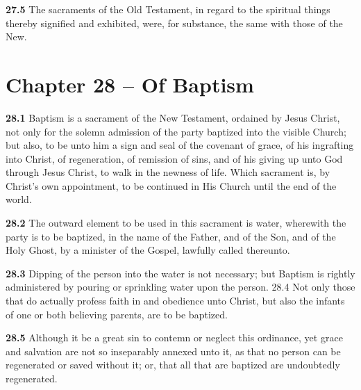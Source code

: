 \par\textbf{27.5} The sacraments of the Old Testament, in regard to the spiritual things thereby signified and exhibited, were, for substance, the same with those of the New.  

\section{Chapter 28 -- Of Baptism}

\par\textbf{28.1} Baptism is a sacrament of the New Testament, ordained by Jesus Christ, not only for the solemn admission of the party baptized into the visible Church; but also, to be unto him a sign and seal of the covenant of grace, of his ingrafting into Christ, of regeneration, of remission of sins, and of his giving up unto God through Jesus Christ, to walk in the newness of life. Which sacrament is, by Christ's own appointment, to be continued in His Church until the end of the world.   

\par\textbf{28.2} The outward element to be used in this sacrament is water, wherewith the party is to be baptized, in the name of the Father, and of the Son, and of the Holy Ghost, by a minister of the Gospel, lawfully called thereunto.   

\par\textbf{28.3} Dipping of the person into the water is not necessary; but Baptism is rightly administered by pouring or sprinkling water upon the person.  28.4 Not only those that do actually profess faith in and obedience unto Christ, but also the infants of one or both believing parents, are to be baptized.   

\par\textbf{28.5} Although it be a great sin to contemn or neglect this ordinance, yet grace and salvation are not so inseparably annexed unto it, as that no person can be regenerated or saved without it; or, that all that are baptized are undoubtedly regenerated.   

